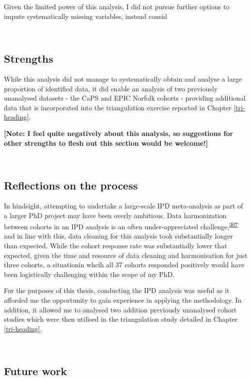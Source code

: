 \documentclass[a4paper, twoside]{templates/ociamthesis}
\begin{document}
Given the limited power of this analysis, I did not pursue further options to impute systematically missing variables, instead consid

~

\hypertarget{strengths-1}{%
\subsection{Strengths}\label{strengths-1}}

While this analysis did not manage to systematically obtain and analyse a large proportion of identified data, it did enable an analysis of two previously unanalysed datasets - the CaPS and EPIC Norfolk cohorts - providing additional data that is incorporated into the triangulation exercise reported in Chapter \ref{tri-heading}.

\textbf{{[}Note: I feel quite negatively about this analysis, so suggestions for other strengths to flesh out this section would be welcome!{]}}

~

\hypertarget{reflections-on-the-process}{%
\subsection{Reflections on the process}\label{reflections-on-the-process}}

In hindsight, attempting to undertake a large-scale IPD meta-analysis as part of a larger PhD project may have been overly ambitious. Data harmonization between cohorts in an IPD analysis is an often under-appreciated challenge,\textsuperscript{\protect\hyperlink{ref-levis2021}{307}} and in line with this, data cleaning for this analysis took substantially longer than expected. While the cohort response rate was substantially lower that expected, given the time and resource of data cleaning and harmonisation for just three cohorts, a situationin whcih all 37 cohorts responded positively would have been logistically challenging within the scope of my PhD.

For the purposes of this thesis, conducting the IPD analysis was useful as it afforded me the opportunity to gain experience in applying the methodology. In addition, it allowed me to analysed two addition previously unanalysed cohort studies which were then utilised in the triangulation study detailed in Chapter \ref{tri-heading}.

~

\hypertarget{future-work}{%
\subsection{Future work}\label{future-work}}
\end{document}

